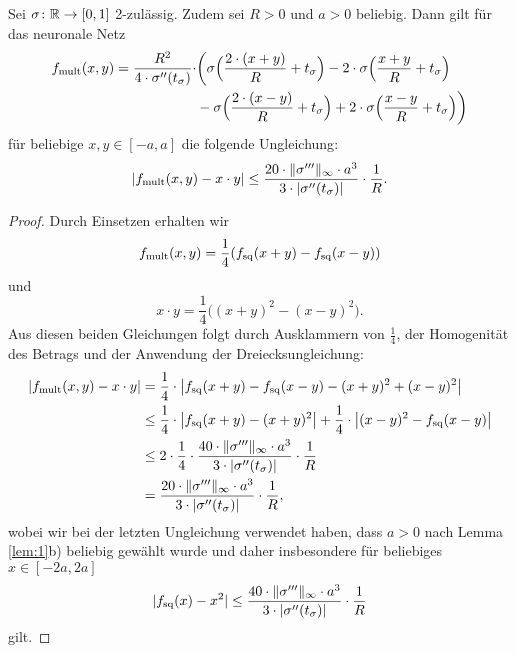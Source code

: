 \begin{lem}
  \label{lem:2}
  Sei $\sigma \colon \mathbb{R} \to [0, 1]$ 2-zulässig. Zudem sei $R > 0$ und $a > 0$ beliebig. Dann gilt für das neuronale Netz
  \begin{equation*}
  	\begin{split}
  	f_{\mathrm{mult}}(x, y) = \frac{R^2}{4 \cdot \sigma''(t_{\sigma})} \cdot & \bigg(\sigma\Big(\frac{2 \cdot (x + y)}{R} + t_{\sigma} \Big) - 2 \cdot \sigma\Big(\frac{x + y}{R} + t_{\sigma}\Big) \\
  	& - \sigma \Big(\frac{2 \cdot (x - y)}{R} + t_{\sigma} \Big) + 2 \cdot \sigma \Big(\frac{x - y}{R} + t_{\sigma} \Big) \bigg)
  	\end{split}
  	\end{equation*}
  	für beliebige $x, y \in [-a, a]$ die folgende Ungleichung$\colon$
  	$$|f_{\mathrm{mult}}(x, y) - x \cdot y| \leq \frac{20 \cdot \|\sigma'''\|_{\infty} \cdot a ^3}{3 \cdot |\sigma''(t_{\sigma})|} \cdot \frac{1}{R}.$$
  \end{lem}
  \begin{proof}
  Durch Einsetzen erhalten wir $$f_{\mathrm{mult}}(x,y) = \frac{1}{4}(f_{\mathrm{sq}}(x + y) - f_{\mathrm{sq}}(x - y))$$ und $$x \cdot y = \frac{1}{4}\big((x + y)^2 - (x - y)^2\big).$$
  Aus diesen beiden Gleichungen folgt durch Ausklammern von $\frac{1}{4}$, der Homogenität des Betrags und der Anwendung der Dreiecksungleichung$\colon$
  \begin{equation*}
  \begin{split}
  |f_{\mathrm{mult}}(x, y) - x \cdot y| & = \frac{1}{4} \cdot \big|f_{\mathrm{sq}}(x + y) - f_{\mathrm{sq}}(x - y) - (x + y)^2 + (x - y)^2\big| \\
  & \leq \frac{1}{4} \cdot \big|f_{\mathrm{sq}}(x + y) - (x + y)^2\big| + \frac{1}{4}\cdot\big| (x - y)^2 - f_{\mathrm{sq}}(x - y)\big| \\
  & \leq 2 \cdot \frac{1}{4} \cdot \frac{40 \cdot \|\sigma'''\|_{\infty} \cdot a^3}{3 \cdot |\sigma''(t_{\sigma})|} \cdot \frac{1}{R} \\
  & = \frac{20 \cdot \|\sigma'''\|_{\infty} \cdot a ^3}{3 \cdot |\sigma''(t_{\sigma})|} \cdot \frac{1}{R},
  \end{split}
\end{equation*}   
wobei wir bei der letzten Ungleichung verwendet haben, dass $a > 0$ nach Lemma \ref{lem:1}b) beliebig gewählt wurde und daher insbesondere für beliebiges $x \in [-2a,2a]$ $$ |f_{\mathrm{sq}}(x) - x^2| \leq \frac{40 \cdot \|\sigma'''\|_{\infty} \cdot a^3}{3 \cdot |\sigma''(t_{\sigma})|} \cdot \frac{1}{R}$$ gilt. 
  \end{proof}
